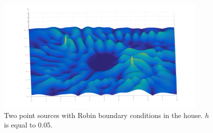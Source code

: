 \documentclass[10pt,a4paper]{article}
\begin{document}
\begin{figure}[H]
\centering
    \includegraphics[width=0.9\textwidth]{figures/house_doublesource.pdf}
	\caption{Two point sources with Robin boundary conditions in the house. $h$ is equal to 0.05.}
  \label{fig:house2sources}
\end{figure}
\end{document}
